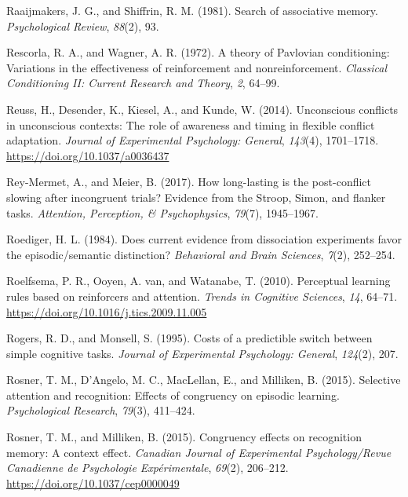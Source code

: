 \documentclass[]{DissertateCUNY}
\begin{document}
\leavevmode\hypertarget{ref-raaijmakers_search_1981}{}%
Raaijmakers, J. G., and Shiffrin, R. M. (1981). Search of associative
memory. \emph{Psychological Review}, \emph{88}(2), 93.

\leavevmode\hypertarget{ref-rescorla_theory_1972}{}%
Rescorla, R. A., and Wagner, A. R. (1972). A theory of Pavlovian
conditioning: Variations in the effectiveness of reinforcement and
nonreinforcement. \emph{Classical Conditioning II: Current Research and
Theory}, \emph{2}, 64--99.

\leavevmode\hypertarget{ref-reuss_unconscious_2014}{}%
Reuss, H., Desender, K., Kiesel, A., and Kunde, W. (2014). Unconscious
conflicts in unconscious contexts: The role of awareness and timing in
flexible conflict adaptation. \emph{Journal of Experimental Psychology:
General}, \emph{143}(4), 1701--1718.
\url{https://doi.org/10.1037/a0036437}

\leavevmode\hypertarget{ref-rey-mermet_how_2017}{}%
Rey-Mermet, A., and Meier, B. (2017). How long-lasting is the
post-conflict slowing after incongruent trials? Evidence from the
Stroop, Simon, and flanker tasks. \emph{Attention, Perception, \&
Psychophysics}, \emph{79}(7), 1945--1967.

\leavevmode\hypertarget{ref-roediger_does_1984}{}%
Roediger, H. L. (1984). Does current evidence from dissociation
experiments favor the episodic/semantic distinction? \emph{Behavioral
and Brain Sciences}, \emph{7}(2), 252--254.

\leavevmode\hypertarget{ref-roelfsema_perceptual_2010}{}%
Roelfsema, P. R., Ooyen, A. van, and Watanabe, T. (2010). Perceptual
learning rules based on reinforcers and attention. \emph{Trends in
Cognitive Sciences}, \emph{14}, 64--71.
\url{https://doi.org/10.1016/j.tics.2009.11.005}

\leavevmode\hypertarget{ref-rogers_costs_1995}{}%
Rogers, R. D., and Monsell, S. (1995). Costs of a predictible switch
between simple cognitive tasks. \emph{Journal of Experimental
Psychology: General}, \emph{124}(2), 207.

\leavevmode\hypertarget{ref-rosner_selective_2015}{}%
Rosner, T. M., D'Angelo, M. C., MacLellan, E., and Milliken, B. (2015).
Selective attention and recognition: Effects of congruency on episodic
learning. \emph{Psychological Research}, \emph{79}(3), 411--424.

\leavevmode\hypertarget{ref-rosner_congruency_2015}{}%
Rosner, T. M., and Milliken, B. (2015). Congruency effects on
recognition memory: A context effect. \emph{Canadian Journal of
Experimental Psychology/Revue Canadienne de Psychologie Expérimentale},
\emph{69}(2), 206--212. \url{https://doi.org/10.1037/cep0000049}
\end{document}
